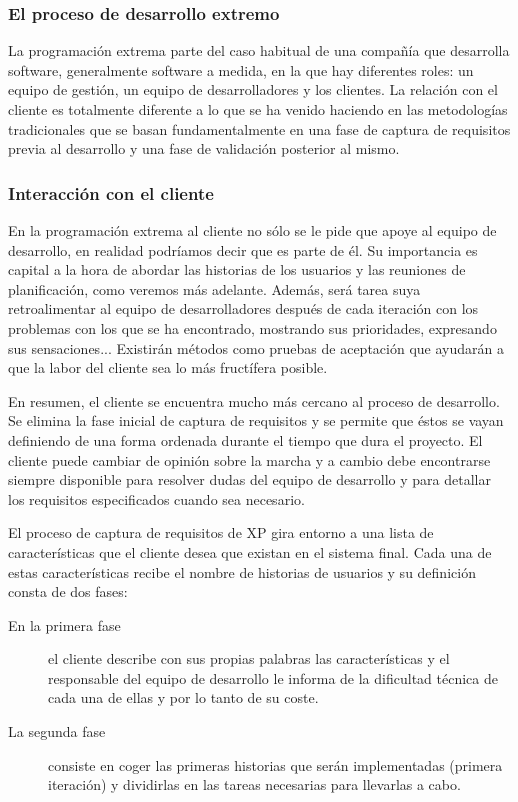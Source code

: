 \documentclass[12pt]{book} %
\begin{document}
		\subsubsection{El proceso de desarrollo extremo}
			La programación extrema parte del caso habitual de una compañía que desarrolla software, generalmente software a medida, en la
			que hay diferentes roles: un equipo de gestión, un equipo de desarrolladores y los clientes. La relación con el cliente es
			totalmente diferente a lo que se ha venido haciendo en las metodologías tradicionales que se basan fundamentalmente en una fase
			de captura de requisitos previa al desarrollo y una fase de validación posterior al mismo. 
			
		\subsubsection{Interacción con el cliente }
			En la programación extrema al cliente no sólo se le pide que apoye al equipo de desarrollo, en realidad podríamos decir que es
			parte de él. Su importancia es capital a la hora de abordar las historias de los usuarios y las reuniones de planificación, como
			veremos más adelante. Además, será tarea suya retroalimentar al equipo de desarrolladores después de cada iteración con los
			problemas con los que se ha encontrado, mostrando sus prioridades, expresando sus sensaciones... Existirán métodos como pruebas
			de aceptación que ayudarán a que la labor del cliente sea lo más fructífera posible.
			
			
			En resumen, el cliente se encuentra mucho más cercano al proceso de desarrollo. Se elimina la fase inicial de captura de
			requisitos y se permite que éstos se vayan definiendo de una forma ordenada durante el tiempo que dura el proyecto. 
			El cliente puede cambiar de opinión sobre la marcha y a cambio debe encontrarse siempre disponible para resolver dudas del
			equipo de desarrollo y para detallar los requisitos especificados cuando sea necesario. 
			
			El proceso de captura de requisitos de XP gira entorno a una lista de características que el cliente desea que existan en el
			sistema final. Cada una de estas características recibe el nombre de historias de usuarios y su definición consta de dos fases:
						
			\begin{description}
				\item[En la primera fase] el cliente describe con sus propias palabras las características y el responsable del equipo de
					desarrollo le informa de la dificultad técnica de cada una de ellas y por lo tanto de su coste.
				\item[La segunda fase] consiste en coger las primeras historias que serán implementadas (primera iteración) y dividirlas 
					en las tareas necesarias para llevarlas a 	cabo.
			\end{description}
			
\end{document}
